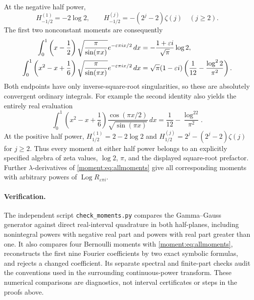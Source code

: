 At the negative half power,
\[
 H_{-1/2}^{(1)}=-2\log2,\qquad
 H_{-1/2}^{(j)}=-(2^j-2)\zeta(j)\quad(j\ge2).
\]
The first two nonconstant moments are consequently
\begin{align}\label{moment:eq:halfexamples}
 \int_0^1\left(x-\frac12\right)
  \sqrt{\frac\pi{\sin(\pi x)}}e^{-\varepsilon\pi i x/2}\,dx
 &=-\frac{1+\varepsilon i}{\sqrt\pi}\log2,\notag\\
 \int_0^1\left(x^2-x+\frac16\right)
  \sqrt{\frac\pi{\sin(\pi x)}}e^{-\varepsilon\pi i x/2}\,dx
 &=\sqrt\pi(1-\varepsilon i)
     \left(\frac1{12}-\frac{\log^22}{\pi^2}\right).
\end{align}
Both endpoints have only inverse-square-root singularities, so these
are absolutely convergent ordinary integrals. For example the second
identity also yields the entirely real evaluation
\begin{equation}\label{moment:eq:realhalf}
 \int_0^1\left(x^2-x+\frac16\right)
 \frac{\cos(\pi x/2)}{\sqrt{\sin(\pi x)}}\,dx
 =\frac1{12}-\frac{\log^22}{\pi^2}.
\end{equation}
At the positive half power,
$H_{1/2}^{(1)}=2-2\log2$ and
$H_{1/2}^{(j)}=2^j-(2^j-2)\zeta(j)$ for $j\ge2$.
Thus every moment at either half power belongs to an explicitly
specified algebra of zeta values, $\log2$, $\pi$, and the displayed
square-root prefactor. Further $\lambda$-derivatives of
\eqref{moment:eq:allmoments} give all corresponding moments with
arbitrary powers of $\operatorname{Log}R_{\varepsilon\pi i}$.

\paragraph{Verification.}
The independent script \texttt{check\_moments.py} compares the
Gamma--Gauss generator against direct real-interval quadrature in both
half-planes, including nonintegral powers with negative real part and
powers with real part greater than one. It also compares four Bernoulli
moments with \eqref{moment:eq:allmoments}, reconstructs the first nine
Fourier coefficients by two exact symbolic formulas, and rejects a
changed coefficient. Its separate spectral and finite-part checks audit
the conventions used in the surrounding continuous-power transform.
These numerical comparisons are diagnostics, not interval certificates
or steps in the proofs above.
